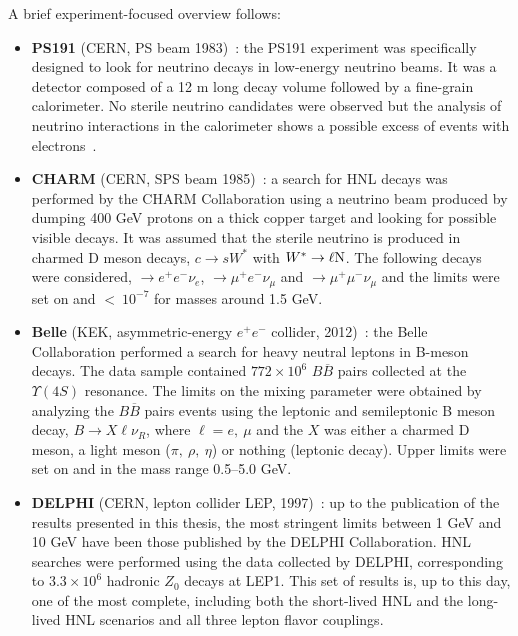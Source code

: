 A brief experiment-focused overview follows:
\begin{itemize}
\item \textbf{PS191} (CERN, PS beam 1983)~\cite{BERNARDI1988332}: the PS191
  experiment was specifically designed to look for neutrino decays in
  low-energy neutrino beams. It was a detector composed of a 12 m long
  decay volume followed by a fine-grain calorimeter. No sterile
  neutrino candidates were observed but the analysis of neutrino
  interactions in the calorimeter shows a possible excess of events
  with electrons~\cite{Vannucci:1985vs}.
\item \textbf{CHARM} (CERN, SPS beam 1985)~\cite{DORENBOSCH1986473}: a search
  for HNL decays  was performed by the CHARM Collaboration using a
  neutrino beam produced by dumping 400 GeV protons on a thick copper
  target and looking for possible visible decays. It was assumed that
  the sterile neutrino is produced in charmed D meson decays, \ie $c\rightarrow s W^{*}$ with $W^{*} \rightarrow \ell \mathrm{N}$. The following decays were considered, \hnl $\rightarrow
  e^+e^-\nu_e$, $\rightarrow \mu^+e^-\nu_\mu$ and $\rightarrow
  \mu^+\mu^-\nu_\mu$ and the limits were set on \mixpare and
  \mixparm $< \:10^{-7}$ for \hnl masses around 1.5 GeV. 
\item \textbf{Belle} (KEK, asymmetric-energy $e^+e^-$ collider, 2012)~\cite{Liventsev_2013}: the Belle Collaboration
  performed a search for heavy neutral leptons in B-meson
  decays. The data sample contained $772\times 10^6$ $B\overline{B}$
  pairs collected at the $\Upsilon(4S)$ resonance. The limits
  on the mixing parameter were obtained by analyzing the $B\overline{B}$ pairs
  events using the leptonic and semileptonic B meson decay,
  $B\rightarrow X\ell\nu_R$, where $\ell = e, \: \mu$ and the $X$ was
  either a charmed D meson, a light meson ($\pi, \: \rho, \: \eta$) or
  nothing (leptonic decay). Upper limits were set on \mixpare and
  \mixparm in the mass range 0.5--5.0 GeV. 
\item \textbf{DELPHI} (CERN, lepton collider LEP, 1997)~\cite{Abreu:1996pa}:
  up to the publication of the results presented in this thesis, the most stringent limits between 1 GeV and 10 GeV have been those published by the DELPHI Collaboration. HNL searches were performed
  using the data collected by DELPHI, corresponding to $3.3
  \times 10^6$ hadronic $Z_0$ decays at LEP1. This set of results is, up to
  this day, one of the most complete, including both the short-lived HNL and the long-lived
  HNL scenarios and all three lepton flavor couplings. 

\end{itemize}
